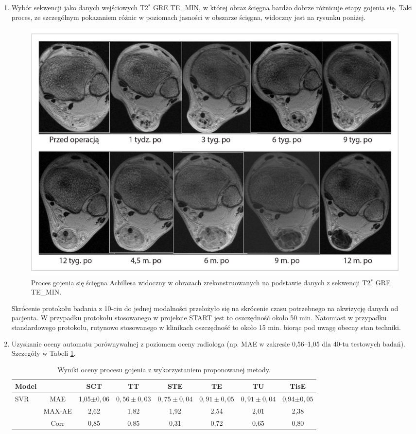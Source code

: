 \begin{enumerate}
	\item Wybór sekwencji jako danych wejściowych T2$^\ast$ GRE TE\_MIN, w której obraz ścięgna bardzo dobrze różnicuje etapy gojenia się. Taki proces, ze szczególnym pokazaniem różnic w poziomach jasności w obszarze ścięgna, widoczny jest na rysunku poniżej.
	\begin{figure}[h!]
		\centering
		\includegraphics[width=1\textwidth]{figures/T2gremin.jpg}
		\caption{Proces gojenia się ścięgna Achillesa widoczny w obrazach zrekonstruowanych na podstawie danych z sekwencji T2$^\ast$ GRE TE\_MIN.}\label{fig:T2comp}
	\end{figure}
	
	Skrócenie protokołu badania z 10-ciu do jednej modalności przełożyło się na skrócenie czasu potrzebnego na akwizycję danych od pacjenta. W przypadku protokołu stosowanego w projekcie START jest to oszczędność około 50 min. Natomiast w przypadku standardowego protokołu, rutynowo stosowanego w klinikach oszczędność to około 15 min. biorąc pod uwagę obecny stan techniki. 
	\item Uzyskanie oceny automatu porównywalnej z poziomem oceny radiologa (np. MAE w zakresie 0,56--1,05 dla 40-tu testowych badań). Szczegóły w Tabeli \ref{tab:trainset}. 
	\vspace{0.5 cm}
	\begin{table}[h!]
		\scriptsize
		\caption{Wyniki oceny procesu gojenia z wykorzystaniem proponowanej metody.}
		\vspace{-0.5 cm}
		\begin{center}
			\begin{tabular}{lc||c|c|c|c|c|c}
				\textbf{Model} & & \textbf{SCT} & \textbf{TT} & \textbf{STE} & \textbf{TE} & \textbf{TU} & \textbf{TisE}\\ 				
				\hline \hline
				\multirow{3}{*}{SVR}
				& MAE & 1,05$\pm0,06$ & $0,56\pm0,03$ & $0,75\pm0,04$ & $0,91\pm0,05$ & $0,91\pm0,04$ & 0,94$\pm0,05$\\
				& MAX-AE & 2,62 & 1,82 & 1,92 & 2,54 & 2,01 & 2,38 \\
				& Corr   & 0,85 & 0,85 & 0,31 & 0,72 & 0,65 & 0,80 \\
				\hline
			\end{tabular}
		\end{center}
		\label{tab:trainset}
	\end{table}	
	

\end{enumerate}
